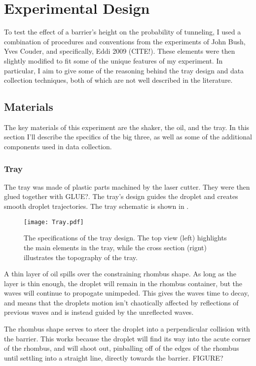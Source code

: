 \chapter{Experimental Design}

To test the effect of a barrier's height on the probability of tunneling, I used a combination of procedures and conventions from the experiments of John Bush, Yves Couder, and specifically, Eddi 2009 (CITE!). These elements were then slightly modified to fit some of the unique features of my experiment. In particular, I aim to give some of the reasoning behind the tray design and data collection techniques, both of which are not well described in the literature.

\section{Materials}
The key materials of this experiment are the shaker, the oil, and the tray. In this section I'll describe the specifics of the big three, as well as some of the additional components used in data collection. 

\subsection{Tray}
The tray was made of plastic parts machined by the laser cutter. They were then glued together with GLUE?. The tray's design guides the droplet and creates smooth droplet trajectories. The tray schematic is shown in . 

\begin{figure}[h!]
	\centering
	\texttt{[image: Tray.pdf]}
	\caption{The specifications of the tray design. The top view (left) highlights the main elements in the tray, while the cross section (rignt) illustrates the topography of the tray.}
	\label{tray}
\end{figure}

A thin layer of oil spills over the constraining rhombus shape. As long as the layer is thin enough, the droplet will remain in the rhombus container, but the waves will continue to propogate unimpeded. This gives the waves time to decay, and means that the droplets motion isn't chaotically affected by reflections of previous waves and is instead guided by the unreflected waves. 

The rhombus shape serves to steer the droplet into a perpendicular collision with the barrier. This works because the droplet will find its way into the acute corner of the rhombus, and will shoot out, pinballing off of the edges of the rhombus until settling into a straight line, directly towards the barrier.  FIGURE?

